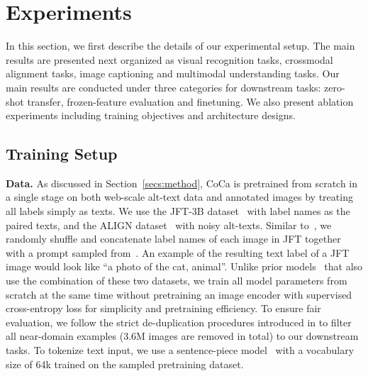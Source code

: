 \section{Experiments}
In this section, we first describe the details of our experimental setup. The main results are presented next organized as visual recognition tasks, crossmodal alignment tasks, image captioning and multimodal understanding tasks. Our main results are conducted under three categories for downstream tasks: zero-shot transfer, frozen-feature evaluation and finetuning.
We also present ablation experiments including training objectives and architecture designs.

\subsection{Training Setup}

\textbf{Data.}
As discussed in Section~\ref{secs:method}, CoCa is pretrained from scratch in a single stage on both web-scale alt-text data and annotated images by treating all labels simply as texts.
We use the JFT-3B dataset~\cite{zhai2021scaling} with label names as the paired texts,
and the ALIGN dataset~\citep{jia2021scaling} with noisy alt-texts.
Similar to~\cite{pham2021combined},
we randomly shuffle and concatenate label names of each image in JFT together with a prompt sampled from~\cite{radford2021learning}. An example of the resulting text label of a JFT image would look like ``a photo of the {cat, animal}''.
Unlike prior models~\cite{zhai2021lit, pham2021combined} that also use the combination of these two datasets,
we train all model parameters from scratch at the same time without pretraining an image encoder with supervised cross-entropy loss for simplicity and pretraining efficiency.
To ensure fair evaluation,
we follow the strict de-duplication procedures introduced in \citep{zhai2021lit, jia2021scaling} to filter all near-domain examples (3.6M images are removed in total) to our downstream tasks. To tokenize text input,
we use a sentence-piece model~\cite{sennrich2015neural, kudo2018subword} with a vocabulary size of 64k trained on the sampled pretraining dataset.

